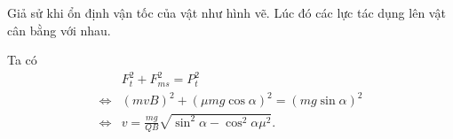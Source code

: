  \begin{loigiai}
        Giả sử khi ổn định vận tốc của vật như hình vẽ. Lúc đó các lực tác dụng lên vật cân bằng với nhau.\\
        \begin{minipage}{0.5\textwidth}
         Ta có 
        \begin{equation*}
            \begin{aligned}
             &F_t^2+F_{ms}^2=P_t^2\\
             \Leftrightarrow&\left(mvB \right) ^2+\left(\mu mg\cos\alpha\right)^2=\left(mg\sin\alpha\right)^2\\
             \Leftrightarrow& v=\frac{mg}{QB}\sqrt{\sin^2\alpha-\cos^2\alpha\mu^2}.
            \end{aligned}
        \end{equation*}
        \end{minipage}
       \begin{minipage}{0.5\textwidth}
        \begin{center}

\begin{tikzpicture}[x=0.75pt,y=0.75pt,yscale=-1,xscale=1]


\end{tikzpicture}
\end{center}
\end{minipage}
\end{loigiai}
